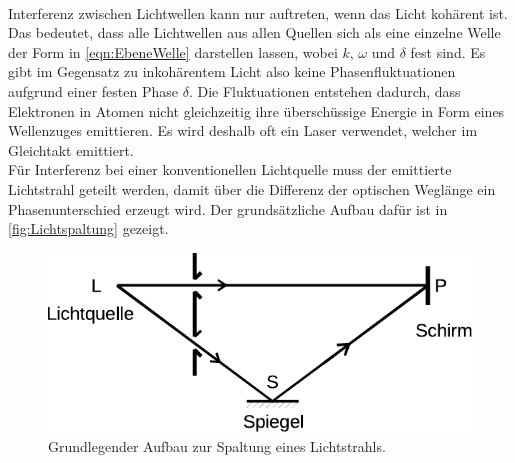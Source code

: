     \\
    Interferenz zwischen Lichtwellen kann nur auftreten,
    wenn das Licht kohärent ist.
    Das bedeutet,
    dass alle Lichtwellen aus allen Quellen sich als eine einzelne Welle der Form in \autoref{eqn:EbeneWelle} darstellen lassen,
    wobei $k$, $\omega$ und $\delta$ fest sind.
    Es gibt im Gegensatz zu inkohärentem Licht also keine Phasenfluktuationen aufgrund einer festen Phase $\delta$.
    Die Fluktuationen entstehen dadurch,
    dass Elektronen in Atomen nicht gleichzeitig ihre überschüssige Energie in Form eines Wellenzuges emittieren.
    Es wird deshalb oft ein Laser verwendet,
    welcher im Gleichtakt emittiert.\\
    Für Interferenz bei einer konventionellen Lichtquelle muss der emittierte Lichtstrahl geteilt werden,
    damit über die Differenz der optischen Weglänge ein Phasenunterschied erzeugt wird.
    Der grundsätzliche Aufbau dafür ist in \autoref{fig:Lichtspaltung} gezeigt.

    \begin{figure}
        \centering
        \includegraphics{content/img/Abb_1.pdf}
        \caption{Grundlegender Aufbau zur Spaltung eines Lichtstrahls. \cite{versuchsanleitung}}
        \label{fig:Lichtspaltung}
    \end{figure}

